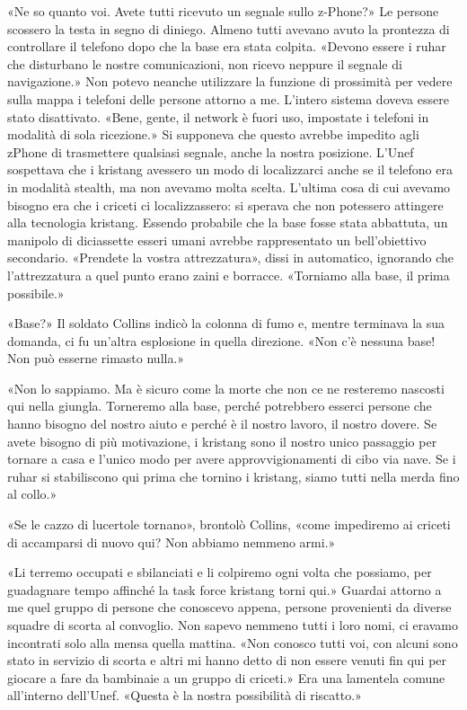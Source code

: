 «Ne so quanto voi. Avete tutti ricevuto un segnale sullo z-Phone?» Le
persone scossero la testa in segno di diniego. Almeno tutti avevano
avuto la prontezza di controllare il telefono dopo che la base era stata
colpita. «Devono essere i ruhar che disturbano le nostre comunicazioni,
non ricevo neppure il segnale di navigazione.» Non potevo neanche
utilizzare la funzione di prossimità per vedere sulla mappa i telefoni
delle persone attorno a me. L'intero sistema doveva essere stato
disattivato. «Bene, gente, il network è fuori uso, impostate i telefoni
in modalità di sola ricezione.» Si supponeva che questo avrebbe impedito
agli zPhone di trasmettere qualsiasi segnale, anche la nostra posizione.
L'Unef sospettava che i kristang avessero un modo di localizzarci anche
se il telefono era in modalità stealth, ma non avevamo molta scelta.
L'ultima cosa di cui avevamo bisogno era che i criceti ci
localizzassero: si sperava che non potessero attingere alla tecnologia
kristang. Essendo probabile che la base fosse stata abbattuta, un
manipolo di diciassette esseri umani avrebbe rappresentato un
bell'obiettivo secondario. «Prendete la vostra attrezzatura», dissi in
automatico, ignorando che l'attrezzatura a quel punto erano zaini e
borracce. «Torniamo alla base, il prima possibile.»

«Base?» Il soldato Collins indicò la colonna di fumo e, mentre terminava
la sua domanda, ci fu un'altra esplosione in quella direzione. «Non c'è
nessuna base! Non può esserne rimasto nulla.»

«Non lo sappiamo. Ma è sicuro come la morte che non ce ne resteremo
nascosti qui nella giungla. Torneremo alla base, perché potrebbero
esserci persone che hanno bisogno del nostro aiuto e perché è il nostro
lavoro, il nostro dovere. Se avete bisogno di più motivazione, i
kristang sono il nostro unico passaggio per tornare a casa e l'unico
modo per avere approvvigionamenti di cibo via nave. Se i ruhar si
stabiliscono qui prima che tornino i kristang, siamo tutti nella merda
fino al collo.»

«Se le cazzo di lucertole tornano», brontolò Collins, «come impediremo
ai criceti di accamparsi di nuovo qui? Non abbiamo nemmeno armi.»

«Li terremo occupati e sbilanciati e li colpiremo ogni volta che
possiamo, per guadagnare tempo affinché la task force kristang torni
qui.» Guardai attorno a me quel gruppo di persone che conoscevo appena,
persone provenienti da diverse squadre di scorta al convoglio. Non
sapevo nemmeno tutti i loro nomi, ci eravamo incontrati solo alla mensa
quella mattina. «Non conosco tutti voi, con alcuni sono stato in
servizio di scorta e altri mi hanno detto di non essere venuti fin qui
per giocare a fare da bambinaie a un gruppo di criceti.» Era una
lamentela comune all'interno dell'Unef. «Questa è la nostra possibilità
di riscatto.»

